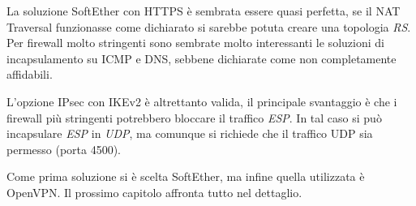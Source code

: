 La soluzione SoftEther con HTTPS è sembrata essere quasi perfetta, se il NAT Traversal
funzionasse come dichiarato si sarebbe potuta creare una topologia \textit{RS}.
Per firewall molto stringenti sono sembrate molto interessanti le soluzioni di incapsulamento
su ICMP  e DNS, sebbene dichiarate come non completamente affidabili.

L'opzione IPsec con IKEv2 è altrettanto valida, il principale svantaggio è che i firewall più stringenti
potrebbero bloccare il traffico \textit{ESP}. In tal caso si può incapsulare \textit{ESP} in \textit{UDP},
ma comunque si richiede che il traffico UDP sia permesso (porta 4500).

Come prima soluzione si è scelta SoftEther, ma infine quella utilizzata è OpenVPN. Il
prossimo capitolo affronta tutto nel dettaglio.
